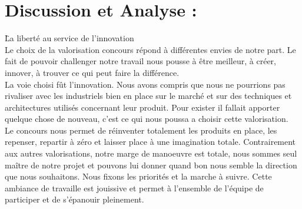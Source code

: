 \chapter{Discussion et Analyse :}

\"La liberté au service de l'innovation\"\\

Le choix de la valorisation concours répond à différentes envies de notre part. Le fait de pouvoir challenger notre travail nous pousse à être meilleur, à créer, innover, à trouver ce qui peut faire la différence.\\
La voie choisi fût l’innovation. Nous avons compris que nous ne pourrions pas rivaliser avec les industriels bien en place sur le marché et sur des techniques et architectures utilisés concernant leur produit. Pour exister il fallait apporter quelque chose de nouveau, c’est ce qui nous poussa a choisir cette valorisation.\\
Le concours nous permet de réinventer totalement les produits en place, les repenser, repartir à zéro et laisser place à une imagination totale. Contrairement aux autres valorisations, notre marge de manoeuvre est totale, nous sommes seul maître de notre projet et pouvons lui donner quand bon nous semble la direction que nous souhaitons. Nous fixons les priorités et la marche à suivre. Cette ambiance de travaille est jouissive et permet à l’ensemble de l’équipe de participer et de s’épanouir pleinement.\\